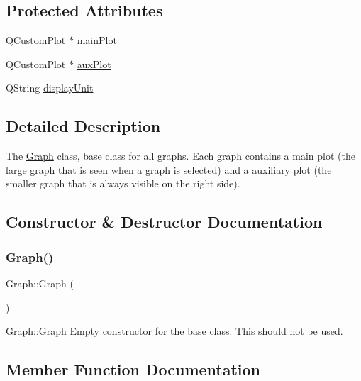 \subsection*{Protected Attributes}
\begin{DoxyCompactItemize}
\item 
Q\+Custom\+Plot $\ast$ \hyperlink{class_graph_a02239013b745a7c1411a7f8623cc2073}{main\+Plot}
\item 
Q\+Custom\+Plot $\ast$ \hyperlink{class_graph_ac7d10642e5439fd87d7d4bc5a33e643d}{aux\+Plot}
\item 
Q\+String \hyperlink{class_graph_a28488c31277fec31c8d54a44860efede}{display\+Unit}
\end{DoxyCompactItemize}


\subsection{Detailed Description}
The \hyperlink{class_graph}{Graph} class, base class for all graphs. Each graph contains a main plot (the large graph that is seen when a graph is selected) and a auxiliary plot (the smaller graph that is always visible on the right side). 

\subsection{Constructor \& Destructor Documentation}
\hypertarget{class_graph_ae4c72b8ac4d693c49800a4c7e273654f}{}\label{class_graph_ae4c72b8ac4d693c49800a4c7e273654f} 
\subsubsection{\texorpdfstring{Graph()}{Graph()}}
{\footnotesize\ttfamily Graph\+::\+Graph (\begin{DoxyParamCaption}{ }\end{DoxyParamCaption})}



\hyperlink{class_graph_ae4c72b8ac4d693c49800a4c7e273654f}{Graph\+::\+Graph} Empty constructor for the base class. This should not be used. 



\subsection{Member Function Documentation}
\hypertarget{class_graph_a85028910472bc7815ad024ca025bb142}{}\label{class_graph_a85028910472bc7815ad024ca025bb142} 
